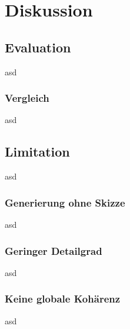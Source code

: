 \chapter{Diskussion}



\section{Evaluation}

asd


\subsection{Vergleich}

asd


\section{Limitation}

asd


\subsection{Generierung ohne Skizze}

asd


\subsection{Geringer Detailgrad}

asd


\subsection{Keine globale Kohärenz}

asd


